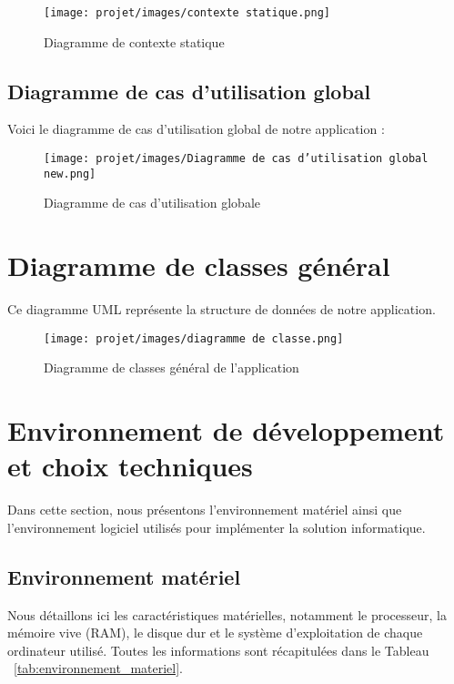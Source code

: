 \begin{figure}[H]
    \centering
    \texttt{[image: projet/images/contexte statique.png]}
    \caption{Diagramme de contexte statique}
\end{figure}

\subsection{Diagramme de cas d’utilisation global}
Voici le diagramme de cas d’utilisation global de notre application :

\begin{figure}[H]
    \centering
    \texttt{[image: projet/images/Diagramme de cas d’utilisation global new.png]}
    \caption{Diagramme de cas d'utilisation globale}
\end{figure}

\section{Diagramme de classes général}

Ce diagramme UML représente la structure de données de notre application.

\begin{figure}[H]
    \centering
    \texttt{[image: projet/images/diagramme de classe.png]}
    \caption{Diagramme de classes général de l'application}
    \label{fig:diagramme_classe}
\end{figure}

\section{Environnement de développement et choix techniques}

Dans cette section, nous présentons l’environnement matériel ainsi que l’environnement logiciel utilisés pour implémenter la solution informatique.

\subsection{Environnement matériel}

Nous détaillons ici les caractéristiques matérielles, notamment le processeur, la mémoire vive (RAM), le disque dur et le système d’exploitation de chaque ordinateur utilisé. Toutes les informations sont récapitulées dans le Tableau ~\ref{tab:environnement_materiel}.

